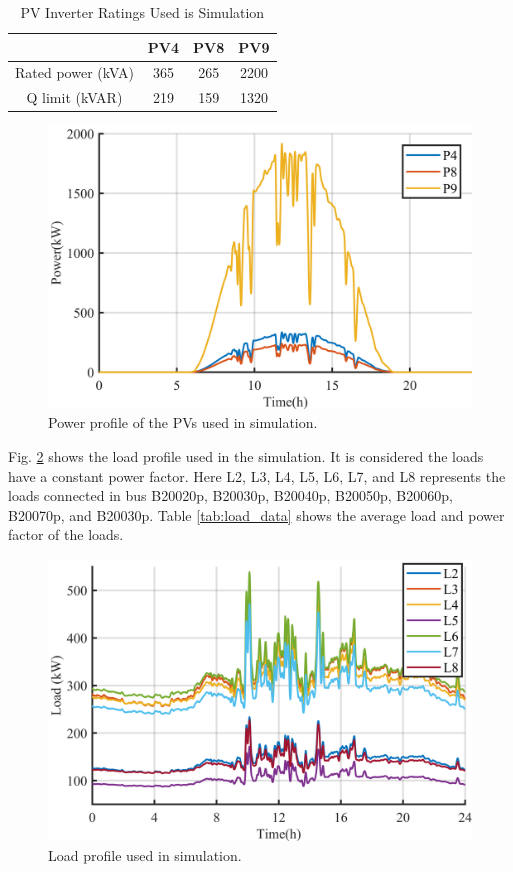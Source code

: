 \begin{table}[!h]
\centering
\caption{PV Inverter Ratings Used is Simulation}
\label{tab:Inv_rate}
\begin{tabular}{c|c|c|c|}
\cline{2-4}
 & PV4 & PV8 & PV9 \\ \hline
\multicolumn{1}{|c|}{Rated power (kVA)} & 365 & 265 & 2200 \\ \hline
\multicolumn{1}{|c|}{Q limit (kVAR)} & 219 & 159 & 1320 \\ \hline
\end{tabular}
\end{table}

\begin{figure}[!htb]
\centering
\includegraphics[width=\linewidth]{figs/PV_profiles.png} 
\caption{Power profile of the PVs used in simulation.}
\label{fig:PV_PROF}
\end{figure}

Fig. \ref{fig:Load_PROF} shows the load profile used in the simulation. It is considered the loads have a constant power factor. Here L2, L3, L4, L5, L6, L7, and L8 represents the loads connected in bus B20020p, B20030p, B20040p, B20050p, B20060p, B20070p, and B20030p. Table \ref{tab:load_data} shows the average load and power factor of the loads.

\begin{figure}[!htb]
\centering
\includegraphics[width=\linewidth]{figs/Load_profiles.png} 
\caption{Load profile used in simulation.}
\label{fig:Load_PROF}
\end{figure}

